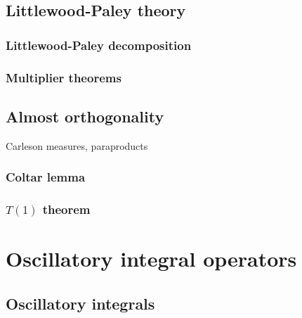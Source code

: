 \documentclass{../../large}
\begin{document}
\begin{prb}
\end{prb}



\chapter{Littlewood-Paley theory}
\section{Littlewood-Paley decomposition}
\section{Multiplier theorems}



\chapter{Almost orthogonality}
Carleson measures, paraproducts
\section{Coltar lemma}
\section{$T(1)$ theorem}




\part{Oscillatory integral operators}


\chapter{Oscillatory integrals}
\end{document}

